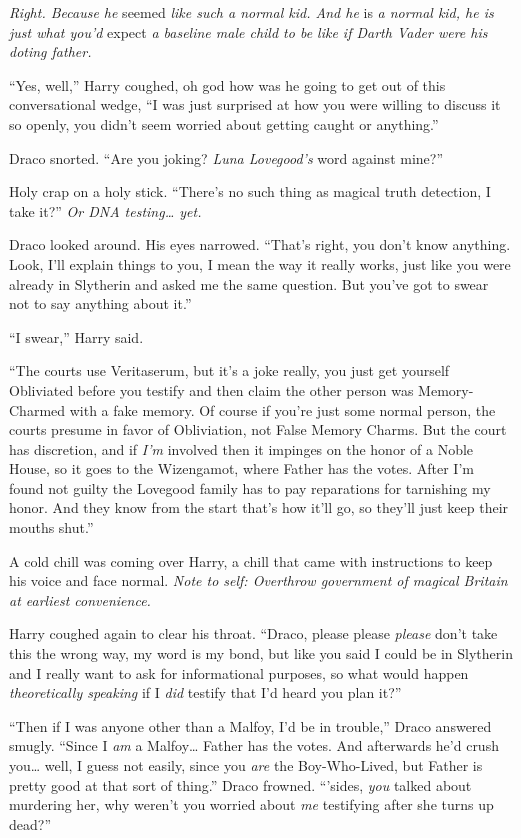\emph{Right. Because he} seemed \emph{like such a normal kid. And he} is
\emph{a normal kid, he is just what you'd} expect \emph{a baseline male
child to be like if Darth Vader were his doting father.}

``Yes, well,'' Harry coughed, oh god how was he going to get out of this
conversational wedge, ``I was just surprised at how you were willing to
discuss it so openly, you didn't seem worried about getting caught or
anything.''

Draco snorted. ``Are you joking? \emph{Luna Lovegood's} word against
mine?''

Holy crap on a holy stick. ``There's no such thing as magical truth
detection, I take it?'' \emph{Or DNA testing\ldots{} yet.}

Draco looked around. His eyes narrowed. ``That's right, you don't know
anything. Look, I'll explain things to you, I mean the way it really
works, just like you were already in Slytherin and asked me the same
question. But you've got to swear not to say anything about it.''

``I swear,'' Harry said.

``The courts use Veritaserum, but it's a joke really, you just get
yourself Obliviated before you testify and then claim the other person
was Memory-Charmed with a fake memory. Of course if you're just some
normal person, the courts presume in favor of Obliviation, not False
Memory Charms. But the court has discretion, and if \emph{I'm} involved
then it impinges on the honor of a Noble House, so it goes to the
Wizengamot, where Father has the votes. After I'm found not guilty the
Lovegood family has to pay reparations for tarnishing my honor. And they
know from the start that's how it'll go, so they'll just keep their
mouths shut.''

A cold chill was coming over Harry, a chill that came with instructions
to keep his voice and face normal. \emph{Note to self: Overthrow
government of magical Britain at earliest convenience.}

Harry coughed again to clear his throat. ``Draco, please please
\emph{please} don't take this the wrong way, my word is my bond, but
like you said I could be in Slytherin and I really want to ask for
informational purposes, so what would happen \emph{theoretically
speaking} if I \emph{did} testify that I'd heard you plan it?''

``Then if I was anyone other than a Malfoy, I'd be in trouble,'' Draco
answered smugly. ``Since I \emph{am} a Malfoy\ldots{} Father has the
votes. And afterwards he'd crush you\ldots{} well, I guess not easily,
since you \emph{are} the Boy-Who-Lived, but Father is pretty good at
that sort of thing.'' Draco frowned. ``'sides, \emph{you} talked about
murdering her, why weren't you worried about \emph{me} testifying after
she turns up dead?''

